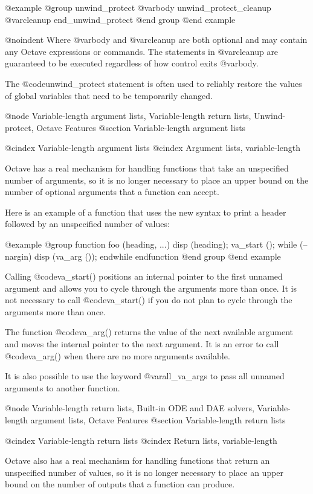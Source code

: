 @example
@group
unwind_protect
  @var{body}
unwind_protect_cleanup
  @var{cleanup}
end_unwind_protect
@end group
@end example

@noindent
Where @var{body} and @var{cleanup} are both optional and may contain any
Octave expressions or commands.  The statements in @var{cleanup} are 
guaranteed to be executed regardless of how control exits @var{body}.

The @code{unwind_protect} statement is often used to reliably restore
the values of global variables that need to be temporarily changed.

@node Variable-length argument lists, Variable-length return lists, Unwind-protect, Octave Features
@section Variable-length argument lists

@cindex Variable-length argument lists
@cindex Argument lists, variable-length

Octave has a real mechanism for handling functions that take an
unspecified number of arguments, so it is no longer necessary to place
an upper bound on the number of optional arguments that a function can
accept.

Here is an example of a function that uses the new syntax to print a
header followed by an unspecified number of values:

@example
@group
function foo (heading, ...)
  disp (heading);
  va_start ();
  while (--nargin)
    disp (va_arg ());
  endwhile
endfunction
@end group
@end example

Calling @code{va_start()} positions an internal pointer to the first
unnamed argument and allows you to cycle through the arguments more than
once.  It is not necessary to call @code{va_start()} if you do not plan
to cycle through the arguments more than once.

The function @code{va_arg()} returns the value of the next available
argument and moves the internal pointer to the next argument.  It is an
error to call @code{va_arg()} when there are no more arguments
available.

It is also possible to use the keyword @var{all_va_args} to pass all
unnamed arguments to another function.

@node Variable-length return lists, Built-in ODE and DAE solvers, Variable-length argument lists, Octave Features
@section Variable-length return lists

@cindex Variable-length return lists
@cindex Return lists, variable-length

Octave also has a real mechanism for handling functions that return an
unspecified number of values, so it is no longer necessary to place an
upper bound on the number of outputs that a function can produce.

